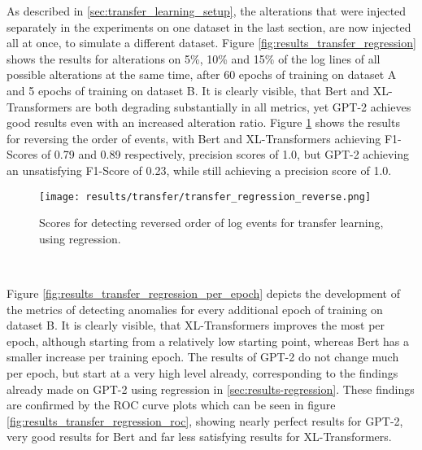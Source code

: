 As described in \ref{sec:transfer_learning_setup}, the alterations that were injected separately in the experiments on one dataset in the last section, are now injected all at once, to simulate a different dataset. Figure \ref{fig:results_transfer_regression} shows the results for alterations on 5\%, 10\% and 15\% of the log lines of all possible alterations at the same time, after 60 epochs of training on dataset A and 5 epochs of training on dataset B. It is clearly visible, that Bert and XL-Transformers are both degrading substantially in all metrics, yet GPT-2 achieves good results even with an increased alteration ratio. Figure \ref{fig:regression_transfer_reverse} shows the results for reversing the order of events, with Bert and XL-Transformers achieving F1-Scores of 0.79 and 0.89 respectively, precision scores of 1.0, but GPT-2 achieving an unsatisfying F1-Score of 0.23, while still achieving a precision score of 1.0.


\begin{figure}[h]
  \centering
  \texttt{[image: results/transfer/transfer\_regression\_reverse.png]}\\
  \caption{Scores for detecting reversed order of log events for transfer learning, using regression.}
  \label{fig:regression_transfer_reverse}
\end{figure}

\begin{figure*}[ht!]
\hspace{\fill}
\hspace{\fill}
   \\
\caption{\label{fig:results_transfer_regression}Transfer learning with different ratios of alteration, using regression.}
\end{figure*}


Figure \ref{fig:results_transfer_regression_per_epoch} depicts the development of the metrics of detecting anomalies for every additional epoch of training on dataset B. It is clearly visible, that XL-Transformers improves the most per epoch, although starting from a relatively low starting point, whereas Bert has a smaller increase per training epoch. The results of GPT-2 do not change much per epoch, but start at a very high level already, corresponding to the findings already made on GPT-2 using regression in \ref{sec:results-regression}. These findings are confirmed by the ROC curve plots which can be seen in figure \ref{fig:results_transfer_regression_roc}, showing nearly perfect results for GPT-2, very good results for Bert and far less satisfying results for XL-Transformers.

